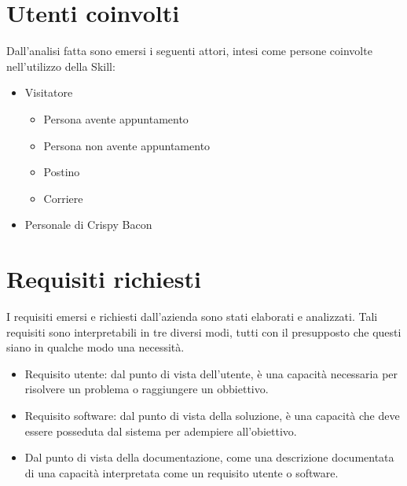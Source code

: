 \section{Utenti coinvolti}
Dall'analisi fatta sono emersi i seguenti attori, intesi come persone coinvolte nell'utilizzo della Skill:
\begin{itemize}
    \item Visitatore
        \begin{itemize}
            \item Persona avente appuntamento
            \item Persona non avente appuntamento
            \item Postino
            \item Corriere
        \end{itemize}
    \item Personale di Crispy Bacon
\end{itemize}

\section{Requisiti richiesti}
I requisiti emersi e richiesti dall'azienda sono stati elaborati e analizzati. Tali requisiti sono interpretabili in tre diversi modi, tutti con il presupposto che questi siano in qualche modo una necessità.
\begin{itemize}
    \item Requisito utente: dal punto di vista dell'utente, è una capacità necessaria per risolvere un problema o raggiungere un obbiettivo.
    \item Requisito software: dal punto di vista della soluzione, è una capacità che deve essere posseduta dal sistema per adempiere all'obiettivo.
    \item Dal punto di vista della documentazione, come una descrizione documentata di una capacità interpretata come un requisito utente o software.
\end{itemize}
